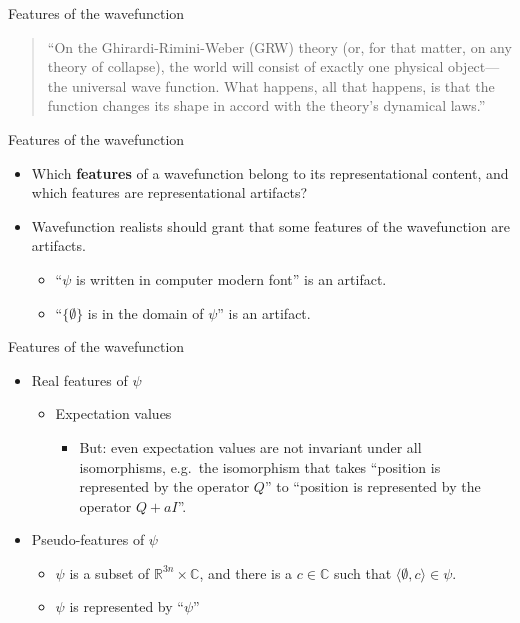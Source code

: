 \documentclass{beamer}
\begin{document}
\begin{frame}{Features of the wavefunction}

  \begin{quote}
    ``On the Ghirardi-Rimini-Weber (GRW) theory (or, for that matter,
    on any theory of collapse), the world will consist of exactly one
    physical object---the universal wave function. What happens, all
    that happens, is that the function changes its shape in accord
    with the theory's dynamical laws.''
  \end{quote}
\end{frame}

\begin{frame}{Features of the wavefunction}

  \begin{itemize}
  \item Which \textbf{features} of a wavefunction belong to its
    representational content, and which features are representational
    artifacts?
  \item Wavefunction realists should grant that some features of the
    wavefunction are artifacts.

  \begin{itemize}
  \item ``$\psi$ is written in computer modern font'' is an artifact.
  \item ``$\{ \emptyset \}$ is in the domain of $\psi$'' is an
    artifact.
  \end{itemize}
\end{itemize}

\end{frame}

\begin{frame}{Features of the wavefunction}

\begin{itemize}
\item Real features of $\psi$

  \begin{itemize}
  \item Expectation values
    \begin{itemize}
    \item But: even expectation values are not invariant under all
      isomorphisms, e.g.~the isomorphism that takes ``position is
      represented by the operator $Q$'' to ``position is represented
      by the operator $Q+aI$''.
    \end{itemize}
  \end{itemize}

\item Pseudo-features of $\psi$

  \begin{itemize}
  \item $\psi$ is a subset of $\mathbb{R}^{3n}\times \mathbb{C}$, and
    there is a $c\in\mathbb{C}$ such that
    $\langle \emptyset ,c\rangle\in \psi$.
  \item $\psi$ is represented by ``$\psi$''
  \end{itemize}
\end{itemize}

\end{frame}
\end{document}
